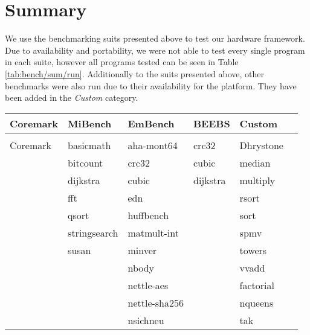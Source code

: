 \documentclass[../bachelor_paper.tex]{subfiles}
\begin{document}
\section{Summary}
We use the benchmarking suits presented above to test our hardware framework. Due to availability and portability, we were not able to test every single program in each suite, however all programs tested can be seen in Table \ref{tab:bench/sum/run}. Additionally to the suits presented above, other benchmarks were also run due to their availability for the platform. They have been added in the \emph{Custom} category.

\begin{table}
    \centering
    \begin{tabular}{llllll}
        \textbf{Coremark}   & \textbf{MiBench}  & \textbf{EmBench}  & \textbf{BEEBS}    & \textbf{Custom}   \\
        \hline\\[-0.9em]
        Coremark            & basicmath         & aha-mont64        & crc32             & Dhrystone         \\
                            & bitcount          & crc32             & cubic             & median            \\
                            & dijkstra          & cubic             & dijkstra          & multiply          \\
                            & fft               & edn               &                   & rsort             \\
                            & qsort             & huffbench         &                   & sort              \\
                            & stringsearch      & matmult-int       &                   & spmv              \\
                            & susan             & minver            &                   & towers            \\
                            &                   & nbody             &                   & vvadd             \\
                            &                   & nettle-aes        &                   & factorial         \\
                            &                   & nettle-sha256     &                   & nqueens           \\
                            &                   & nsichneu          &                   & tak               \\

\end{tabular}
\end{table}
\end{document}
